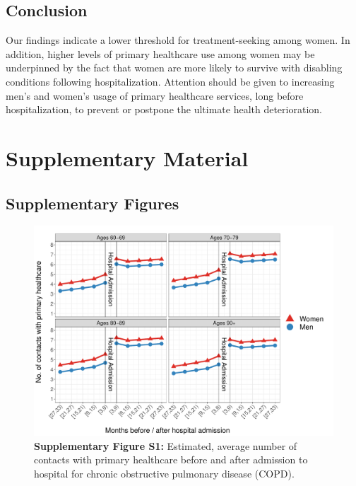 \subsection{Conclusion}
Our findings indicate a lower threshold for treatment-seeking among 
women. In addition, higher levels of primary healthcare use among women 
may be underpinned by the fact that women are more likely to survive 
with disabling conditions following hospitalization. Attention should 
be given to increasing men's and women's usage of primary healthcare 
services, long before hospitalization, to prevent or postpone the 
ultimate health deterioration.\\




\newpage


\section{Supplementary Material}


\subsection{Supplementary Figures}


	\begin{figure}[H]
		\centering
		\includegraphics[scale=0.435]{Paper_2/SUPP_Figure_1_COPD.pdf}
		\caption*{\textbf{Supplementary Figure S1:} Estimated, average number of contacts with 
													primary healthcare before and after admission 
													to hospital for chronic obstructive pulmonary 
													disease (COPD).}
	\label{ch3:figS1}
	\end{figure}
	
